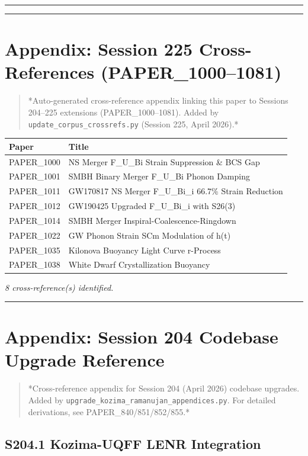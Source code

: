 \documentclass[12pt,a4paper]{article}
\begin{document}
\medskip\hrule\medskip

\medskip\hrule\medskip

\section{Appendix: Session 225 Cross-References (PAPER\_1000--1081)}

\begin{quote}
*Auto-generated cross-reference appendix linking this paper to
Sessions 204--225 extensions (PAPER\_1000--1081). Added by
\texttt{update\_{corpus\_crossrefs}.py} (Session 225, April 2026).*
\end{quote}

\begin{table}[H]
\centering
\small
\begin{tabularx}{\linewidth}{@{}>{\raggedright\arraybackslash}X>{\raggedright\arraybackslash}X@{}}
\toprule
Paper & Title \tabularnewline
\midrule
PAPER\_1000 & NS Merger F\_{U\_Bi} Strain Suppression \& BCS Gap \tabularnewline
PAPER\_1001 & SMBH Binary Merger F\_{U\_Bi} Phonon Damping \tabularnewline
PAPER\_1011 & GW170817 NS Merger F\_{U\_Bi\_i} 66.7\% Strain Reduction \tabularnewline
PAPER\_1012 & GW190425 Upgraded F\_{U\_Bi\_i} with S26(3) \tabularnewline
PAPER\_1014 & SMBH Merger Inspiral-Coalescence-Ringdown \tabularnewline
PAPER\_1022 & GW Phonon Strain SCm Modulation of h(t) \tabularnewline
PAPER\_1035 & Kilonova Buoyancy Light Curve r-Process \tabularnewline
PAPER\_1038 & White Dwarf Crystallization Buoyancy \tabularnewline
\bottomrule
\end{tabularx}
\end{table}

\emph{8 cross-reference(s) identified.}

\medskip\hrule\medskip

\section{Appendix: Session 204 Codebase Upgrade Reference}

\begin{quote}
*Cross-reference appendix for Session 204 (April 2026) codebase upgrades.
Added by \texttt{upgrade\_{kozima\_ramanujan\_appendices}.py}. For detailed derivations,
see PAPER\_840/851/852/855.*
\end{quote}

\subsection{S204.1 Kozima-UQFF LENR Integration}
\end{document}
